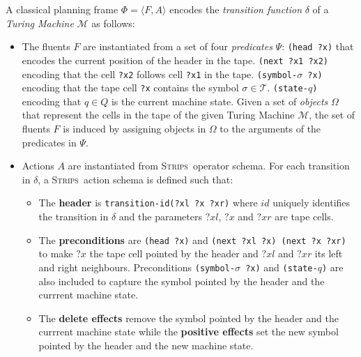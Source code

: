 \documentclass[letterpaper]{article} %
\newcommand{\tup}[1]{{\langle #1 \rangle}}
\newcommand{\strips}{\textsc{Strips}}     %
\begin{document}
A classical planning frame $\Phi=\tup{F,A}$ encodes the {\em transition function} $\delta$ of a {\em Turing Machine} $\mathcal{M}$ as follows:
\begin{itemize}
\item The fluents $F$ are instantiated from a set of four {\em predicates} $\Psi$: {\small\tt (head ?x)} that encodes the current position of the header in the tape. {\small\tt (next ?x1 ?x2)} encoding that the cell {\tt ?x2} follows cell {\tt ?x1} in the tape. {\small\tt (symbol-$\sigma$ ?x)} encoding that the tape cell {\tt ?x} contains the symbol $\sigma\in\mathcal{T}$. {\small\tt (state-$q$)} encoding that $q\in Q$ is the current machine state. Given a set of {\em objects} $\Omega$ that represent the cells in the tape of the given Turing Machine $\mathcal{M}$, the set of fluents $F$ is induced by assigning objects in $\Omega$ to the arguments of the predicates in $\Psi$.
\item Actions $A$ are instantiated from \strips\ operator schema. For each transition in $\delta$, a \strips\ action schema is defined such that:
\begin{itemize}
\item The {\bf header} is {\small\tt transition-id(?xl ?x ?xr)} where $id$ uniquely identifies the transition in $\delta$ and the parameters $?xl$, $?x$ and $?xr$ are tape cells.
\item The {\bf preconditions} are {\small\tt(head ?x)} and {\small\tt (next ?xl ?x) (next ?x ?xr)} to make $?x$ the tape cell pointed by the header and $?xl$ and $?xr$ its left and right neighbours. Preconditions {\small\tt(symbol-$\sigma$ ?x)} and {\small\tt (state-$q$)} are also included to capture the symbol pointed by the header and the currrent machine state.
\item The {\bf delete effects} remove the symbol pointed by the header and the currrent machine state while the {\bf positive effects} set the new symbol pointed by the header and the new machine state.
\end{itemize}
\end{itemize}
\end{document}
